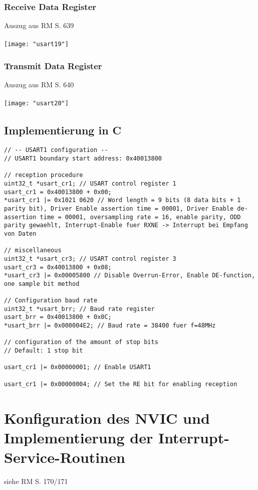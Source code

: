 \documentclass[11pt]{report}
\begin{document}
			\subsubsection{Receive Data Register}
				Auszug aus RM S. 639\\
				\\\texttt{[image: "usart19"]}\\
			\subsubsection{Transmit Data Register}
				Auszug aus RM S. 640\\
				\\\texttt{[image: "usart20"]}\\
		\subsection{Implementierung in C}
			\begin{lstlisting}
// -- USART1 configuration --
// USART1 boundary start address: 0x40013800

// reception procedure
uint32_t *usart_cr1; // USART control register 1
usart_cr1 = 0x40013800 + 0x00;
*usart_cr1 |= 0x1021 0620 // Word length = 9 bits (8 data bits + 1 parity bit), Driver Enable assertion time = 00001, Driver Enable de-assertion time = 00001, oversampling rate = 16, enable parity, ODD parity gewaehlt, Interrupt-Enable fuer RXNE -> Interrupt bei Empfang von Daten

// miscellaneous
uint32_t *usart_cr3; // USART control register 3
usart_cr3 = 0x40013800 + 0x08;
*usart_cr3 |= 0x00005800 // Disable Overrun-Error, Enable DE-function, one sample bit method

// Configuration baud rate
uint32_t *usart_brr; // Baud rate register
usart_brr = 0x40013800 + 0x0C;
*usart_brr |= 0x000004E2; // Baud rate = 38400 fuer f=48MHz

// configuration of the amount of stop bits
// Default: 1 stop bit

usart_cr1 |= 0x00000001; // Enable USART1

usart_cr1 |= 0x00000004; // Set the RE bit for enabling reception
			\end{lstlisting}
	\section{Konfiguration des NVIC und Implementierung der Interrupt-Service-Routinen}
		siehe RM S. 170/171
\end{document}
